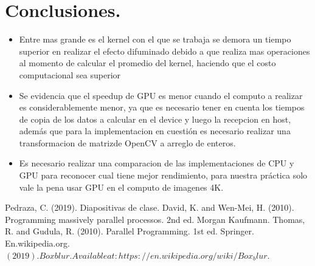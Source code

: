 \documentclass{IEEEtran}
\begin{document}
\begin{itemize}

\end{itemize}


\section*{Conclusiones.}
\begin{itemize}
  \item Entre mas grande es el kernel con el que se trabaja se demora un tiempo superior en realizar el efecto difuminado debido a que realiza mas operaciones al momento de calcular el promedio del kernel, haciendo que el costo computacional sea superior
  \item Se evidencia que el speedup de GPU es menor cuando el computo a realizar es considerablemente menor, ya que es necesario tener en cuenta los tiempos de copia de los datos a calcular en el device y luego la recepcion en host, además que para la implementacion en cuestión es necesario realizar una transformacion de matrizde OpenCV a arreglo de enteros.
  \item Es necesario realizar una comparacion de las implementaciones de CPU y GPU para reconocer cual tiene mejor rendimiento, para nuestra práctica solo vale la pena usar GPU en el computo de imagenes 4K.
\end{itemize}


\noindent 


\begin{thebibliography}{00}
 Pedraza, C. (2019). Diapositivas de clase.
David, K. and Wen-Mei, H. (2010). Programming massively parallel processos. 2nd ed. Morgan Kaufmann.
 Thomas, R. and Gudula, R. (2010). Parallel Programming. 1st ed. Springer.
 En.wikipedia.org. $(2019). Box blur.  Available at: https://en.wikipedia.org/wiki/Box_blur.$
\end{thebibliography}




\end{document}
